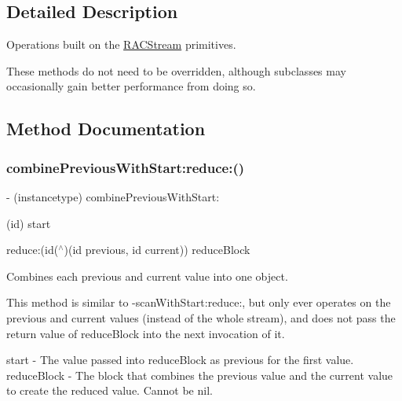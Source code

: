 \subsection{Detailed Description}
Operations built on the \mbox{\hyperlink{interface_r_a_c_stream}{R\+A\+C\+Stream}} primitives.

These methods do not need to be overridden, although subclasses may occasionally gain better performance from doing so. 

\subsection{Method Documentation}
\mbox{\label{category_r_a_c_stream_07_operations_08_a698f6ef68be8d3cb34f9be6efaaa5af7}} 
\subsubsection{\texorpdfstring{combine\+Previous\+With\+Start\+:reduce\+:()}{combinePreviousWithStart:reduce:()}\hspace{0.1cm}{\footnotesize\ttfamily [1/3]}}
{\footnotesize\ttfamily -\/ (instancetype) combine\+Previous\+With\+Start\+: \begin{DoxyParamCaption}\item[{(id)}]{start }\item[{reduce:(id($^\wedge$)(id previous, id current))}]{reduce\+Block }\end{DoxyParamCaption}}

Combines each previous and current value into one object.

This method is similar to -\/scan\+With\+Start\+:reduce\+:, but only ever operates on the previous and current values (instead of the whole stream), and does not pass the return value of {\ttfamily reduce\+Block} into the next invocation of it.

start -\/ The value passed into {\ttfamily reduce\+Block} as {\ttfamily previous} for the first value. reduce\+Block -\/ The block that combines the previous value and the current value to create the reduced value. Cannot be nil.

